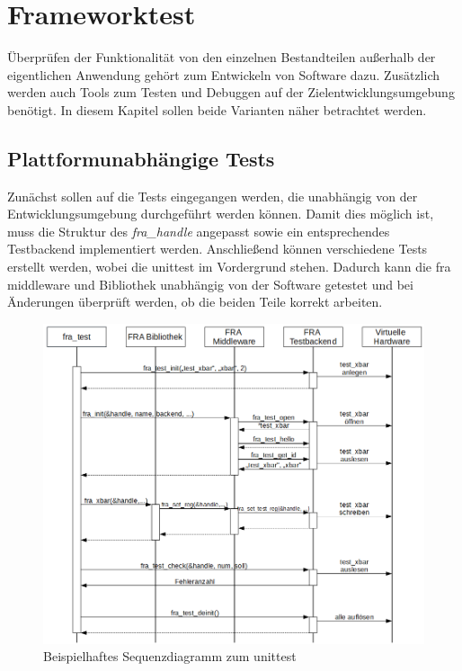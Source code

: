 \chapter{Frameworktest} \label{sec:test}
Überprüfen der Funktionalität von den einzelnen Bestandteilen außerhalb der eigentlichen Anwendung gehört zum Entwickeln von Software dazu. %
Zusätzlich werden auch Tools zum Testen und Debuggen auf der Zielentwicklungsumgebung benötigt. 
In diesem Kapitel sollen beide Varianten näher betrachtet werden.


\section{Plattformunabhängige Tests}
Zunächst sollen auf die Tests eingegangen werden, die unabhängig von der Entwicklungsumgebung durchgeführt werden können. 
Damit dies möglich ist, muss die Struktur des \textit{fra\_handle} angepasst sowie ein entsprechendes Testbackend implementiert werden. Anschließend können verschiedene Tests erstellt werden, wobei die \gls{unittest} im Vordergrund stehen. Dadurch kann die \ac{fra} \gls{middleware} und Bibliothek unabhängig von der Software getestet und bei Änderungen überprüft werden, ob die beiden Teile korrekt arbeiten.

\begin{figure}[!hbtp]
	\centering
	\includegraphics[width = \linewidth]{pictures/2019-11-28-testbackend.png}
	\smallskip
	\caption{Beispielhaftes Sequenzdiagramm zum \gls{unittest}}
	\label{fig:testbackend}
\end{figure} 


